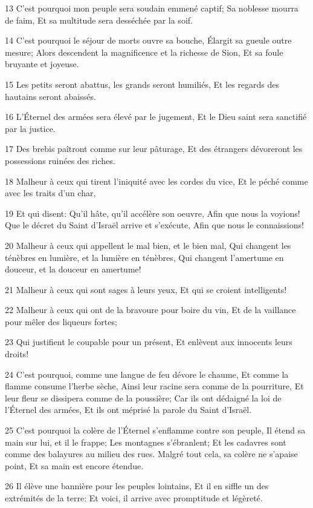 \par 13 C'est pourquoi mon peuple sera soudain emmené captif; Sa noblesse mourra de faim, Et sa multitude sera desséchée par la soif.
\par 14 C'est pourquoi le séjour de morts ouvre sa bouche, Élargit sa gueule outre mesure; Alors descendent la magnificence et la richesse de Sion, Et sa foule bruyante et joyeuse.
\par 15 Les petits seront abattus, les grands seront humiliés, Et les regards des hautains seront abaissés.
\par 16 L'Éternel des armées sera élevé par le jugement, Et le Dieu saint sera sanctifié par la justice.
\par 17 Des brebis paîtront comme sur leur pâturage, Et des étrangers dévoreront les possessions ruinées des riches.
\par 18 Malheur à ceux qui tirent l'iniquité avec les cordes du vice, Et le péché comme avec les traits d'un char,
\par 19 Et qui disent: Qu'il hâte, qu'il accélère son oeuvre, Afin que nous la voyions! Que le décret du Saint d'Israël arrive et s'exécute, Afin que nous le connaissions!
\par 20 Malheur à ceux qui appellent le mal bien, et le bien mal, Qui changent les ténèbres en lumière, et la lumière en ténèbres, Qui changent l'amertume en douceur, et la douceur en amertume!
\par 21 Malheur à ceux qui sont sages à leurs yeux, Et qui se croient intelligents!
\par 22 Malheur à ceux qui ont de la bravoure pour boire du vin, Et de la vaillance pour mêler des liqueurs fortes;
\par 23 Qui justifient le coupable pour un présent, Et enlèvent aux innocents leurs droits!
\par 24 C'est pourquoi, comme une langue de feu dévore le chaume, Et comme la flamme consume l'herbe sèche, Ainsi leur racine sera comme de la pourriture, Et leur fleur se dissipera comme de la poussière; Car ils ont dédaigné la loi de l'Éternel des armées, Et ils ont méprisé la parole du Saint d'Israël.
\par 25 C'est pourquoi la colère de l'Éternel s'enflamme contre son peuple, Il étend sa main sur lui, et il le frappe; Les montagnes s'ébranlent; Et les cadavres sont comme des balayures au milieu des rues. Malgré tout cela, sa colère ne s'apaise point, Et sa main est encore étendue.
\par 26 Il élève une bannière pour les peuples lointains, Et il en siffle un des extrémités de la terre: Et voici, il arrive avec promptitude et légèreté.
